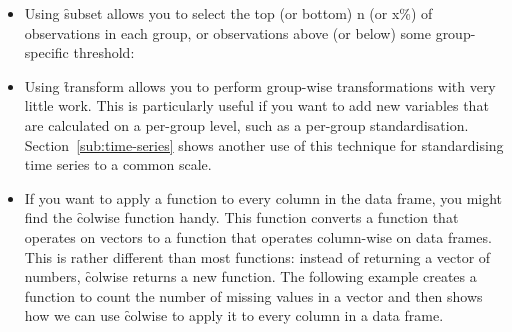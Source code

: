 \begin{itemize}
  \item Using \f{subset} allows you to select the top (or bottom) n (or x\%) of observations in each group, or observations above (or below) some group-specific threshold: 
  
    
  
  \item Using \f{transform} allows you to perform group-wise transformations with very little work.  This is particularly useful if you want to add new variables that are calculated on a per-group level, such as a per-group standardisation.  Section~\ref{sub:time-series} shows another use of this technique for standardising time series to a common scale.   
  
    

  \item If you want to apply a function to every column in the data frame, you might find the \f{colwise} function handy. This function converts a function that operates on vectors to a function that operates column-wise on data frames. This is rather different than most functions: instead of returning a vector of numbers, \f{colwise} returns a new function. The following example creates a function to count the number of missing values in a vector and then shows how we can use \f{colwise} to apply it to every column in a data frame.  

    
  

\end{itemize}
